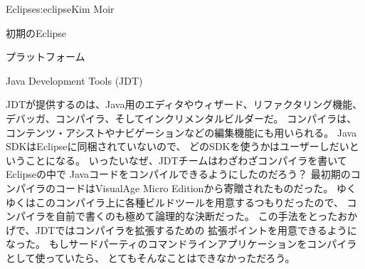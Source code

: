 \begin{aosachapter}{Eclipse}{s:eclipse}{Kim Moir}
\begin{aosasect1}{初期のEclipse}
\begin{aosasect2}{プラットフォーム}
\end{aosasect2}

\begin{aosasect2}{Java Development Tools (JDT)}

JDTが提供するのは、Java用のエディタやウィザード、リファクタリング機能、
デバッガ、コンパイラ、そしてインクリメンタルビルダーだ。
コンパイラは、コンテンツ・アシストやナビゲーションなどの編集機能にも用いられる。
Java SDKはEclipseに同梱されていないので、
どのSDKを使うかはユーザーしだいということになる。
いったいなぜ、JDTチームはわざわざコンパイラを書いてEclipseの中で
Javaコードをコンパイルできるようにしたのだろう？
最初期のコンパイラのコードはVisualAge Micro Editionから寄贈されたものだった。
ゆくゆくはこのコンパイラ上に各種ビルドツールを用意するつもりだったので、
コンパイラを自前で書くのも極めて論理的な決断だった。
この手法をとったおかげで、JDTではコンパイラを拡張するための
拡張ポイントを用意できるようになった。
もしサードパーティのコマンドラインアプリケーションをコンパイラとして使っていたら、
とてもそんなことはできなかっただろう。


\end{aosasect2}
\end{aosasect1}
\end{aosachapter}

